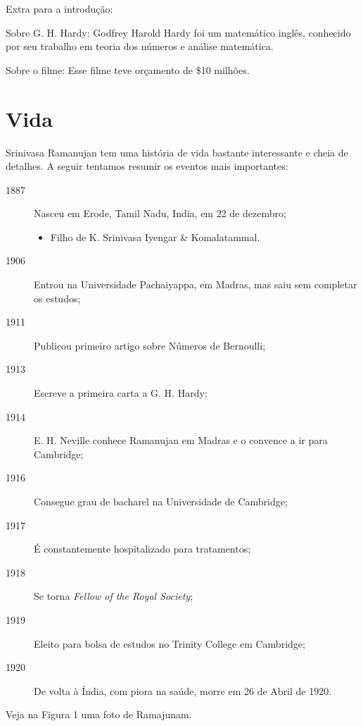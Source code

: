 \documentclass[12pt, a4paper]{article}
\begin{document}
Extra para a introdução:

Sobre G. H. Hardy: Godfrey Harold Hardy foi um matemático inglês, conhecido
por seu trabalho em teoria dos números e análise matemática.

Sobre o filme: Esse filme teve orçamento de \$10 milhões.

\section{Vida}

\noindent 
Srinivasa Ramanujan tem uma história de vida bastante interessante e cheia de
detalhes. A seguir tentamos resumir os eventos mais importantes:

\begin{description}
    \item[1887] Nasceu em Erode, Tamil Nadu, India, em 22 de dezembro;
    \begin{itemize}
        \item Filho de K. Srinivasa Iyengar \& Komalatammal.
    \end{itemize}
    \item[1906] Entrou na Universidade Pachaiyappa, em Madras, mas saiu sem 
                completar os estudos;
    \item[1911] Publicou primeiro artigo sobre Números de Bernoulli;
    \item[1913] Escreve a primeira carta a G. H. Hardy;
    \item[1914] E. H. Neville conhece Ramanujan em Madras e o convence a ir para 
                Cambridge;
    \item[1916] Consegue grau de bacharel na Universidade de Cambridge;
    \item[1917] É constantemente hospitalizado para tratamentos;
    \item[1918] Se torna \textit{Fellow of the Royal Society};
    \item[1919] Eleito para bolsa de estudos no Trinity College em Cambridge;
    \item[1920] De volta à Índia, com piora na saúde, morre em 26 de Abril de
                1920.
\end{description}

Veja na Figura 1 uma foto de Ramajunam.
\end{document}
